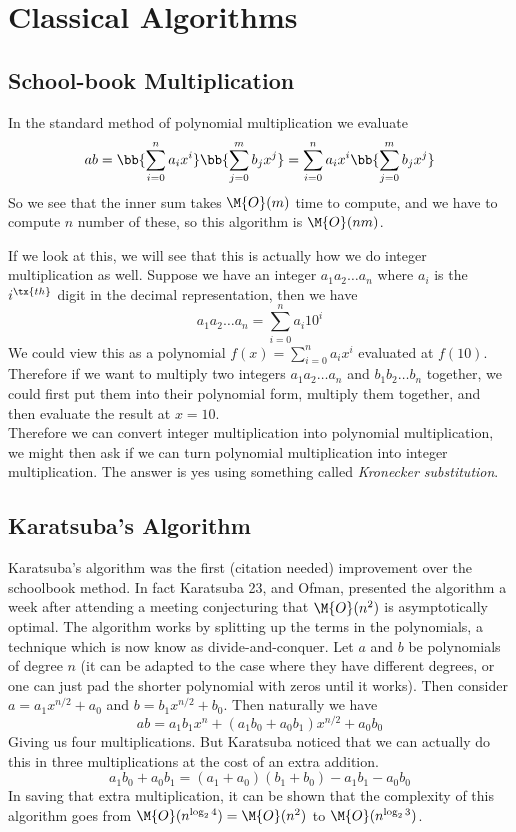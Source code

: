 \chapter{Classical Algorithms}\label{classical algorithms}

\section{School-book Multiplication}
\label{sec:prelim-schoolbook}

In the standard method of polynomial multiplication we evaluate
\[
    ab = \bb{\sum^n_{i=0} a_i x^i}\bb{\sum^m_{j=0} b_j x^j} = \sum^n_{i=0} a_ix^i\bb{\sum^m_{j=0} b_j x^j}
\]
So we see that the inner sum takes $\M{O}(m)$ time to compute, and we have to compute $n$ number of these, so this algorithm is $\M{O}(nm)$.

If we look at this, we will see that this is actually how we do integer multiplication as well. Suppose we have an integer $a_1a_2 \ldots a_n$ where $a_i$ is the $i^\tx{th}$ digit in the decimal representation, then we have
\[
    a_1a_2 \ldots a_n = \sum^n_{i=0} a_i 10^i
\]
We could view this as a polynomial $f(x)= \sum^n_{i=0} a_i x^i$ evaluated at $f(10)$. Therefore if we want to multiply two integers $a_1a_2\ldots a_n$ and $b_1 b_2 \ldots b_n$ together, we could first put them into their polynomial form, multiply them together, and then evaluate the result at $x = 10$.\\

Therefore we can convert integer multiplication into polynomial multiplication, we might then ask if we can turn polynomial multiplication into integer multiplication. The answer is yes using something called \emph{Kronecker substitution}. 


\section{Karatsuba's Algorithm}
\label{sec:prelim-karatsuba}

Karatsuba's algorithm was the first (citation needed) improvement over the schoolbook method. In fact Karatsuba 23, and Ofman, presented the algorithm a week after attending a meeting conjecturing that $\M{O}(n^2)$ is asymptotically optimal. The algorithm works by splitting up the terms in the polynomials, a technique which is now know as divide-and-conquer. Let $a$ and $b$ be polynomials of degree $n$ (it can be adapted to the case where they have different degrees, or one can just pad the shorter polynomial with zeros until it works). Then consider $a = a_1x^{n/2} + a_0$ and $b = b_1x^{n/2} + b_0$. Then naturally we have
\[
    ab = a_1b_1x^n + (a_1b_0 + a_0b_1)x^{n/2} + a_0b_0
\]
Giving us four multiplications. But Karatsuba noticed that we can actually do this in three multiplications at the cost of an extra addition.
\[
    a_1b_0 + a_0b_1 = (a_1 + a_0)(b_1 + b_0) - a_1b_1 - a_0b_0
\]
In saving that extra multiplication, it can be shown that the complexity of this algorithm goes from $\M{O}(n^{\log_2 4}) = \M{O}(n^2)$ to $\M{O}(n^{\log_2 3})$.

